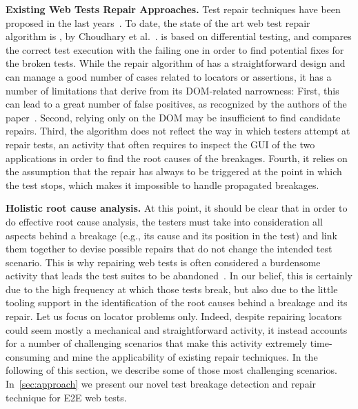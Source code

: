 \noindent
\textbf{Existing Web Tests Repair Approaches.} Test repair techniques have been proposed in the last years~\cite{Gao:2016:SGT:3046547.3046580,Daniel:2011:AGR:2002931.2002937,Daniel:2009:RSR:1747491.1747538,Daniel:2010:TRU:1831708.1831734,Choudhary:2011:WWA:2002931.2002935,Hammoudi-2016-FSE}. 
To date, the state of the art web test repair algorithm is \water, by Choudhary et al.~\cite{Choudhary:2011:WWA:2002931.2002935}. \water is based on differential testing, and compares the correct test execution with the failing one in order to find potential fixes for the broken tests. While the repair algorithm of \water has a straightforward design and can manage a good number of cases related to locators or assertions, it has a number of limitations that derive from its  DOM-related narrowness: First, this can lead to a great number of false positives, as recognized by the authors of the paper~\cite{Choudhary:2011:WWA:2002931.2002935}. Second, 
 relying only on the DOM may be insufficient to find candidate repairs. Third, the algorithm does not reflect the way in which testers attempt at repair tests, an activity that often requires to inspect the GUI of the two applications in order to find the root causes of the breakages. Fourth, it relies on the assumption that the repair has always to be triggered at the point in which the test stops, which makes it impossible to handle propagated breakages. %
 
\noindent
\textbf{Holistic root cause analysis.}
At this point, it should be clear that in order to do effective root cause analysis, the testers must take into consideration all aspects behind a breakage (e.g., its cause and its position in the test) and link them together to devise possible repairs that do not change the intended test scenario. This is why repairing web tests is often considered a burdensome activity that leads the test suites to be abandoned~\cite{Christophe2014}. In our belief, this is certainly due to the high frequency at which those tests break, but also due to the little tooling support in the identification of the root causes behind a breakage and its repair.
%
Let us focus on locator problems only. Indeed, despite repairing locators could seem mostly a mechanical and straightforward activity, it instead accounts for a number of challenging scenarios that make this activity extremely time-consuming and mine the applicability of existing repair techniques. In the following of this section, we describe some of those most challenging scenarios. In~\autoref{sec:approach} we present our novel test breakage detection and repair technique for E2E web tests.
